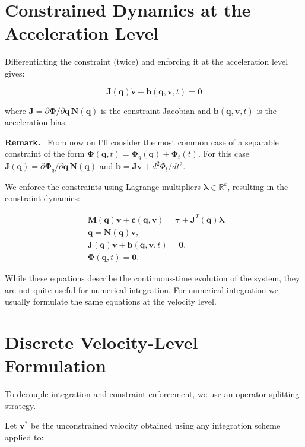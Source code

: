 \documentclass{article}
\newcommand{\mf}[1]{{\mathbf{#1}}}
\newenvironment{remark}{\begin{remarkbox}\textbf{Remark.}~}{\end{remarkbox}}
\begin{document}
\section{Constrained Dynamics at the Acceleration Level}

Differentiating the constraint (twice) and enforcing it at the acceleration
level gives:

\begin{equation}
    \mf{J}(\mf{q}) \dot{\mf{v}} + \mf{b}(\mf{q},\mf{v},t) = \mf{0}
\end{equation}

where \( \mf{J} = \partial \mf{\Phi}/\partial\mf{q}\,\mf{N}(\mf{q})\) is the
constraint Jacobian and $\mf{b}(\mf{q},\mf{v},t)$ is the acceleration bias.

\begin{remark}
From now on I'll consider the most common case of a separable constraint of the
form $\mf{\Phi}(\mf{q}, t) = \mf{\Phi}_q(\mf{q}) + \mf{\Phi}_t(t)$. For this
case $\mf{J}(\mf{q}) = \partial\mf{\Phi}_q/\partial\mf{q}\,\mf{N}(\mf{q})$ and
$\mf{b}= \dot{\mf{J}}\mf{v}+d^2\Phi_t/dt^2$.
\end{remark}

We enforce the constraints using Lagrange multipliers \( \mf{\lambda} \in
\mathbb{R}^k \), resulting in the constraint dynamics:

\begin{eqnarray}
    &\mf{M}(\mf{q}) \dot{\mf{v}} + \mf{c}(\mf{q}, \mf{v}) = \bm{\tau} + \mf{J}^T(\mf{q}) \mf{\lambda},\\    
    &\dot{\mf{q}} = \mf{N}(\mf{q})\mf{v},\\
    &\mf{J}(\mf{q}) \dot{\mf{v}} + \mf{b}(\mf{q},\mf{v},t) = \mf{0},\\
    &\mf{\Phi}(\mf{q}, t) = \mf{0}.
\end{eqnarray}

While these equations describe the continuous-time evolution of the system, they
are not quite useful for numerical integration. For numerical integration we
usually formulate the same equations at the velocity level.

\section{Discrete Velocity-Level Formulation}

To decouple integration and constraint enforcement, we use an operator splitting
strategy.

Let \( \mf{v}^* \) be the unconstrained velocity obtained using any integration
scheme applied to:
\end{document}
